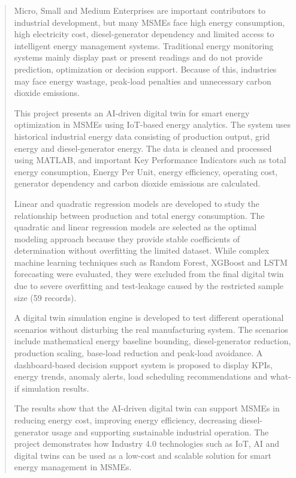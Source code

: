 \begin{abstract}
Micro, Small and Medium Enterprises are important contributors to industrial development, but many MSMEs face high energy consumption, high electricity cost, diesel-generator dependency and limited access to intelligent energy management systems. Traditional energy monitoring systems mainly display past or present readings and do not provide prediction, optimization or decision support. Because of this, industries may face energy wastage, peak-load penalties and unnecessary carbon dioxide emissions.

This project presents an AI-driven digital twin for smart energy optimization in MSMEs using IoT-based energy analytics. The system uses historical industrial energy data consisting of production output, grid energy and diesel-generator energy. The data is cleaned and processed using MATLAB, and important Key Performance Indicators such as total energy consumption, Energy Per Unit, energy efficiency, operating cost, generator dependency and carbon dioxide emissions are calculated.

Linear and quadratic regression models are developed to study the relationship between production and total energy consumption. The quadratic and linear regression models are selected as the optimal modeling approach because they provide stable coefficients of determination without overfitting the limited dataset. While complex machine learning techniques such as Random Forest, XGBoost and LSTM forecasting were evaluated, they were excluded from the final digital twin due to severe overfitting and test-leakage caused by the restricted sample size (59 records).

A digital twin simulation engine is developed to test different operational scenarios without disturbing the real manufacturing system. The scenarios include mathematical energy baseline bounding, diesel-generator reduction, production scaling, base-load reduction and peak-load avoidance. A dashboard-based decision support system is proposed to display KPIs, energy trends, anomaly alerts, load scheduling recommendations and what-if simulation results.

The results show that the AI-driven digital twin can support MSMEs in reducing energy cost, improving energy efficiency, decreasing diesel-generator usage and supporting sustainable industrial operation. The project demonstrates how Industry 4.0 technologies such as IoT, AI and digital twins can be used as a low-cost and scalable solution for smart energy management in MSMEs.
\end{abstract}
